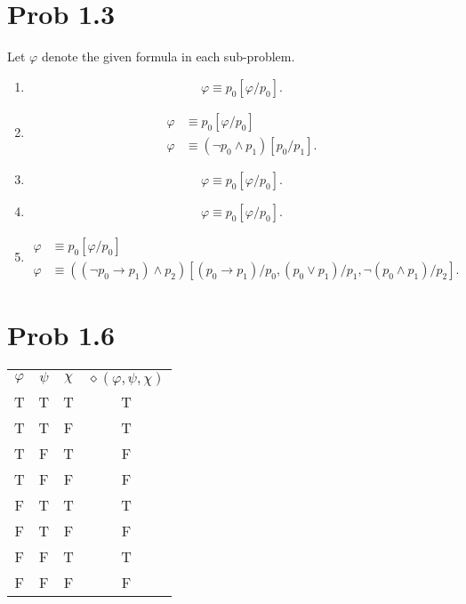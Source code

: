 \documentclass[a4paper]{article}
\begin{document}
\section{Prob 1.3}
Let $\varphi$ denote the given formula in each sub-problem.
\begin{enumerate}
\item \[\varphi \equiv p_{0}[\varphi/p_{0}].\]
\item
  \begin{align*}
    \varphi &\equiv p_{0}[\varphi/p_{0}]\\
    \varphi &\equiv (\lnot p_{0} \wedge p_{1})[p_{0}/p_{1}].
  \end{align*}
\item \[\varphi \equiv p_{0}[\varphi/p_{0}].\]
\item \[\varphi \equiv p_{0}[\varphi/p_{0}].\]
\item
  \begin{align*}
    \varphi &\equiv p_{0}[\varphi/p_{0}]\\
    \varphi &\equiv ((\lnot p_{0} \to p_{1}) \wedge p_{2})[(p_{0} \to p_{1})/p_{0}, (p_{0} \vee p_{1})/p_{1}, \lnot(p_{0} \wedge p_{1})/p_{2}].
  \end{align*}
\end{enumerate}

\section{Prob 1.6}

\begin{tabular}[t]{ccc|c}
  $\varphi$ & $\psi$ & $\chi$ & $\diamond(\varphi,\psi,\chi)$\\
  T & T & T & T\\
  T & T & F & T\\
  T & F & T & F\\
  T & F & F & F\\
  F & T & T & T\\
  F & T & F & F\\
  F & F & T & T\\
  F & F & F & F\\
\end{tabular}
\end{document}
